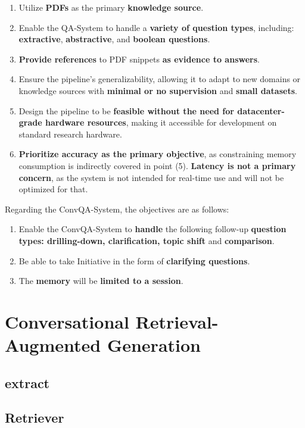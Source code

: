 \begin{enumerate}
    \item Utilize \textbf{PDFs} as the primary \textbf{knowledge source}.
    \item Enable the QA-System to handle a \textbf{variety of question types}, including: \textbf{extractive}, \textbf{abstractive}, and \textbf{boolean questions}.
    \item \textbf{Provide references} to PDF snippets \textbf{as evidence to answers}.
    \item Ensure the pipeline's generalizability, allowing it to adapt to new domains or knowledge sources with \textbf{minimal or no supervision} and \textbf{small datasets}.
    \item Design the pipeline to be \textbf{feasible without the need for datacenter-grade hardware resources}, making it accessible for development on standard research hardware.
    \item \textbf{Prioritize accuracy as the primary objective}, as constraining memory consumption is indirectly covered in point (5). \textbf{Latency is not a primary concern}, as the system is not intended for real-time use and will not be optimized for that.
\end{enumerate}


Regarding the ConvQA-System, the objectives are as follows:

\begin{enumerate}
    \item Enable the ConvQA-System to \textbf{handle} the following follow-up \textbf{question types: drilling-down, clarification, topic shift} and \textbf{comparison}.
    \item Be able to take Initiative in the form of \textbf{clarifying questions}.
    \item The \textbf{memory} will be \textbf{limited to a session}.
\end{enumerate}

\section{Conversational Retrieval-Augmented Generation}
\label{sec:conrag}

\subsection{extract}
\label{subsec:extract}

\subsection{Retriever}
\label{subsec:retriever}

